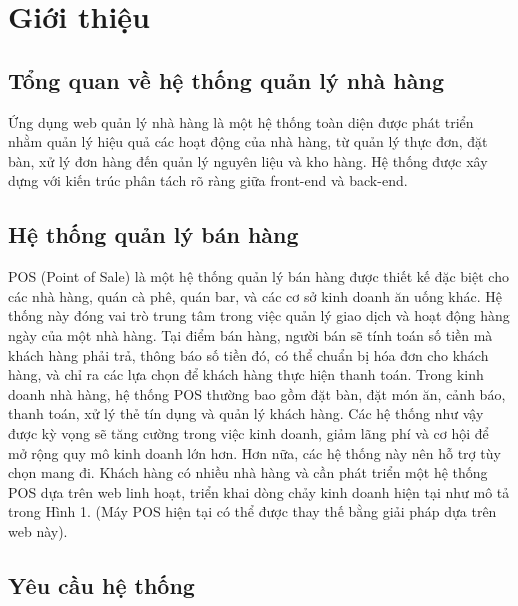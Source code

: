 \documentclass[a4paper]{article}
\begin{document}
\thispagestyle{empty}

\newpage
\tableofcontents
\newpage



\section{Giới thiệu}
\subsection{Tổng quan về hệ thống quản lý nhà hàng}

Ứng dụng web quản lý nhà hàng là một hệ thống toàn diện được phát triển nhằm quản lý hiệu quả các hoạt động của nhà hàng, từ quản lý thực đơn, đặt bàn, xử lý đơn hàng đến quản lý nguyên liệu và kho hàng. Hệ thống được xây dựng với kiến trúc phân tách rõ ràng giữa front-end và back-end.

\subsection{Hệ thống quản lý bán hàng}

POS (Point of Sale) là một hệ thống quản lý bán hàng được thiết kế đặc biệt cho các nhà hàng, quán cà
phê, quán bar, và các cơ sở kinh doanh ăn uống khác. Hệ thống này đóng vai trò trung tâm trong việc
quản lý giao dịch và hoạt động hàng ngày của một nhà hàng. Tại điểm bán hàng, người bán sẽ tính toán
số tiền mà khách hàng phải trả, thông báo số tiền đó, có thể chuẩn bị hóa đơn cho khách hàng, và chỉ ra
các lựa chọn để khách hàng thực hiện thanh toán. Trong kinh doanh nhà hàng, hệ thống POS thường
bao gồm đặt bàn, đặt món ăn, cảnh báo, thanh toán, xử lý thẻ tín dụng và quản lý khách hàng. Các hệ
thống như vậy được kỳ vọng sẽ tăng cường trong việc kinh doanh, giảm lãng phí và cơ hội để mở rộng
quy mô kinh doanh lớn hơn. Hơn nữa, các hệ thống này nên hỗ trợ tùy chọn mang đi. Khách hàng có
nhiều nhà hàng và cần phát triển một hệ thống POS dựa trên web linh hoạt, triển khai dòng chảy kinh
doanh hiện tại như mô tả trong Hình 1. (Máy POS hiện tại có thể được thay thế bằng giải pháp dựa trên
web này).

\subsection{Yêu cầu hệ thống}
\end{document}
